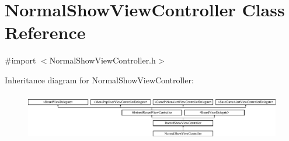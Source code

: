 \hypertarget{interface_normal_show_view_controller}{
\section{NormalShowViewController Class Reference}
\label{interface_normal_show_view_controller}
}


{\ttfamily \#import $<$NormalShowViewController.h$>$}

Inheritance diagram for NormalShowViewController:\begin{figure}[H]
\begin{center}
\leavevmode
\includegraphics[height=2.129278cm]{interface_normal_show_view_controller}
\end{center}
\end{figure}
